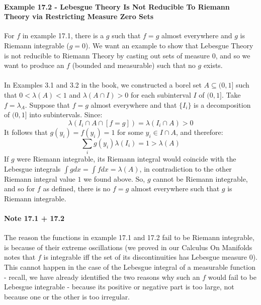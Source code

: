 \documentclass[12pt,a4paper]{article}
\newcommand{\1}[1]{\mathbbm{1}\left\{ #1 \right\}}
\begin{document}
\paragraph{Example 17.2 - Lebesgue Theory Is Not Reducible To Riemann Theory via Restricting Measure Zero Sets} For $f$ in example 17.1, there is a $g$ such that $f = g$ almost everywhere and $g$ is Riemann integrable ($g = 0$). We want an example to show that Lebesgue Theory is not reducible to Riemann Theory by casting out sets of measure 0, and so we want to produce an $f$ (bounded and measurable) such that no $g$ exists.
\\\\
In Examples 3.1 and 3.2 in the book, we constructed a borel set $A \subseteq (0,1]$ such that $0 < \lambda(A) < 1$ and $\lambda(A \cap I) > 0$ for each subinterval $I$ of $(0,1]$. Take $f = \lambda_A$. Suppose that $f = g$ almost everywhere and that $\{I_i\}$ is a decomposition of $(0,1]$ into subintervals. Since:
$$
	\lambda(I_i \cap A \cap [f = g]) = \lambda(I_i \cap A) > 0
$$
It follows that $g(y_i) = f(y_i) = 1$ for some $y_i \in I \cap A$, and therefore:
$$
	\sum_i g(y_i)\lambda(I_i) = 1 > \lambda(A)
$$
If $g$ were Riemann integrable, its Riemann integral would coincide with the Lebesgue integrals $\int g dx = \int f dx = \lambda(A)$, in contradiction to the other Riemann integral value $1$ we found above. So, $g$ cannot be Riemann integrable, and so for $f$ as defined, there is no $f = g$ almost everywhere such that $g$ is Riemann integrable.

\paragraph{Note 17.1 + 17.2} The reason the functions in example 17.1 and 17.2 fail to be Riemann integrable, is because of their extreme oscillations (we proved in our Calculus On Manifolds notes that $f$ is integrable iff the set of its discontinuities has Lebesgue measure 0). This cannot happen in the case of the Lebesgue integral of a measurable function - recall, we have already identified the two reasons why such an $f$ would fail to be Lebesgue integrable - because its positive or negative part is too large, not because one or the other is too irregular.
\end{document}

